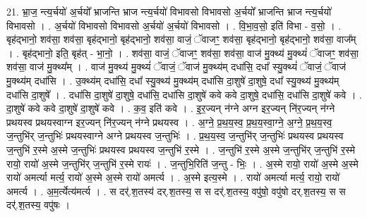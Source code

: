 \documentclass[17pt]{extarticle}
\begin{document}
21. भ्रा॒ज॒ न्त्य॒र्चयो॑ अ॒र्चयो᳚ भ्राजन्ति भ्राज न्त्य॒र्चयो॑ विभावसो विभावसो अ॒र्चयो᳚ भ्राजन्ति भ्राज न्त्य॒र्चयो॑ विभावसो । . अ॒र्चयो॑ विभावसो विभावसो अ॒र्चयो॑ अ॒र्चयो॑ विभावसो । . वि॒भा॒व॒सो॒ इति॑ विभा - व॒सो॒ । . बृह॑द्भानो॒ शव॑सा॒ शव॑सा॒ बृह॑द्भानो॒ बृह॑द्भानो॒ शव॑सा॒ वाजं॒ ॅवाजꣳ॒॒ शव॑सा॒ बृह॑द्भानो॒ बृह॑द्भानो॒ शव॑सा॒ वाज᳚म् । . बृह॑द्भानो॒ इति॒ बृह॑त् - भा॒नो॒ । . शव॑सा॒ वाजं॒ ॅवाजꣳ॒॒ शव॑सा॒ शव॑सा॒ वाज॑ मु॒क्थ्य॑ मु॒क्थ्यं॑ ॅवाजꣳ॒॒ शव॑सा॒ शव॑सा॒ वाज॑ मु॒क्थ्य᳚म् । . वाज॑ मु॒क्थ्य॑ मु॒क्थ्यं॑ ॅवाजं॒ ॅवाज॑ मु॒क्थ्य॑म् दधा॑सि॒ दधा᳚ स्यु॒क्थ्यं॑ ॅवाजं॒ ॅवाज॑ मु॒क्थ्य॑म् दधा॑सि । . उ॒क्थ्य॑म् दधा॑सि॒ दधा᳚ स्यु॒क्थ्य॑ मु॒क्थ्य॑म् दधा॑सि दा॒शुषे॑ दा॒शुषे॒ दधा᳚ स्यु॒क्थ्य॑ मु॒क्थ्य॑म् दधा॑सि दा॒शुषे᳚ । . दधा॑सि दा॒शुषे॑ दा॒शुषे॒ दधा॑सि॒ दधा॑सि दा॒शुषे॑ कवे कवे दा॒शुषे॒ दधा॑सि॒ दधा॑सि दा॒शुषे॑ कवे । . दा॒शुषे॑ कवे कवे दा॒शुषे॑ दा॒शुषे॑ कवे । . क॒व॒ इति॑ कवे । . इ॒र॒ज्यन् न॑ग्ने अग्न इर॒ज्यन् नि॑र॒ज्यन् न॑ग्ने प्रथयस्व प्रथयस्वाग्न इर॒ज्यन् नि॑र॒ज्यन् न॑ग्ने प्रथयस्व । . अ॒ग्ने॒ प्र॒थ॒य॒स्व॒ प्र॒थ॒य॒स्वा॒ग्ने॒ अ॒ग्ने॒ प्र॒थ॒य॒स्व॒ ज॒न्तुभि॑र् ज॒न्तुभिः॑ प्रथयस्वाग्ने अग्ने प्रथयस्व ज॒न्तुभिः॑ । . प्र॒थ॒य॒स्व॒ ज॒न्तुभि॑र् ज॒न्तुभिः॑ प्रथयस्व प्रथयस्व ज॒न्तुभि॑ र॒स्मे अ॒स्मे ज॒न्तुभिः॑ प्रथयस्व प्रथयस्व ज॒न्तुभि॑ र॒स्मे । . ज॒न्तुभि॑ र॒स्मे अ॒स्मे ज॒न्तुभि॑र् ज॒न्तुभि॑ र॒स्मे रायो॒ रायो॑ अ॒स्मे ज॒न्तुभि॑र् ज॒न्तुभि॑ र॒स्मे रायः॑ । . ज॒न्तुभि॒रिति॑ ज॒न्तु - भिः॒ । . अ॒स्मे रायो॒ रायो॑ अ॒स्मे अ॒स्मे रायो॑ अमर्त्या मर्त्य॒ रायो॑ अ॒स्मे अ॒स्मे रायो॑ अमर्त्य । . अ॒स्मे इत्य॒स्मे । . रायो॑ अमर्त्या मर्त्य॒ रायो॒ रायो॑ अमर्त्य । . अ॒म॒र्त्येत्य॑मर्त्य । . स दर्॑.श॒तस्य॑ दर्.श॒तस्य॒ स स दर्॑.श॒तस्य॒ वपु॑षो॒ वपु॑षो दर्.श॒तस्य॒ स स दर्॑.श॒तस्य॒ वपु॑षः । \newline
\end{document}
